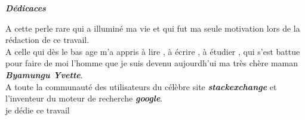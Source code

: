 \newenvironment{dedication}
{
	\thispagestyle{empty}%
	\vspace*{\stretch{1}}%
	\itshape             %
}
{\par %
	\vspace{\stretch{3}} %
}
\begin{center}
	 {\Large \textit {\textbf{Dédicaces }}} 	
\end{center}
\begin{dedication}
A cette perle rare qui a illuminé ma vie et qui fut ma seule motivation lors de la rédaction de ce travail.\\
A celle qui dès le bas age m'a appris à lire , à écrire , à étudier , qui s'est battue pour faire de moi l'homme que je suis devenu aujourdh'ui ma très chère maman \textbf{\textit{Byamungu Yvette}}.\\
A toute la communauté des  utilisateurs du célèbre site \textbf{\textit{stackexchange}} et l'inventeur du moteur de recherche \textbf{\textit{google}}. \\
je dédie ce travail

\end{dedication}






